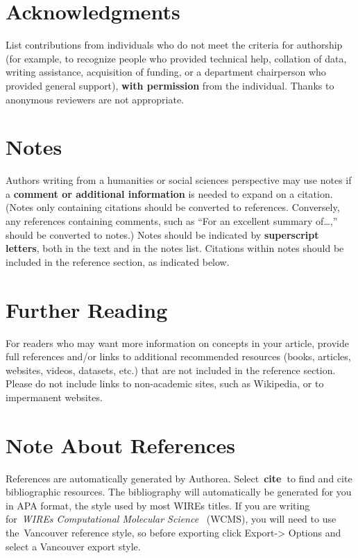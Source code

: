 \documentclass[10pt]{article}
\begin{document}
\section*{Acknowledgments}

{\label{749861}}

List contributions from individuals who do not meet the criteria for
authorship (for example, to recognize people who provided technical
help, collation of data, writing assistance, acquisition of funding, or
a department chairperson who provided general support), \textbf{with
permission} from the individual. Thanks to anonymous reviewers are not
appropriate.

\section*{Notes}

{\label{390481}}

Authors writing from a humanities or social sciences perspective may use
notes if a \textbf{comment or additional information} is needed to
expand on a citation. (Notes only containing citations should be
converted to references. Conversely, any references containing comments,
such as ``For an excellent summary of\ldots{},'' should be converted to
notes.) Notes should be indicated by \textbf{superscript letters}, both
in the text and in the notes list. Citations within notes should be
included in the reference section, as indicated below.

\section*{Further Reading}

{\label{153582}}

For readers who may want more information on concepts in your article,
provide full references and/or links to additional recommended resources
(books, articles, websites, videos, datasets, etc.) that are not
included in the reference section. Please do not include links to
non-academic sites, such as Wikipedia, or to impermanent websites.

\section*{\texorpdfstring{{Note About
References}}{Note About References}}

{\label{514168}}

References are automatically generated by Authorea.
Select~\textbf{cite~}to find and cite bibliographic resources. The
bibliography will automatically be generated for you in APA format, the
style used by most WIREs titles. If you are writing for~\emph{WIREs
Computational Molecular Science}~ (WCMS), you will need to use
the~Vancouver reference style, so before exporting click
Export-\textgreater{} Options and select a Vancouver export style.~
\end{document}
